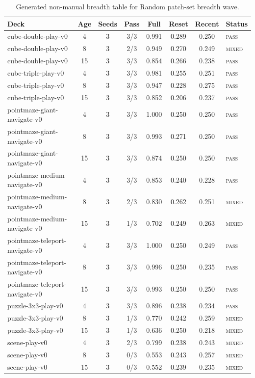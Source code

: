 \begin{table}[!tbp]
\centering
\scriptsize
\setlength{\tabcolsep}{3.5pt}
\renewcommand{\arraystretch}{1.05}
\caption{Generated non-manual breadth table for Random patch-set breadth wave.}
\begin{tabular}{lccccccl}
\toprule
Deck & Age & Seeds & Pass & Full & Reset & Recent & Status\\
\midrule
cube-double-play-v0 & 4 & 3 & 3/3 & 0.991 & 0.289 & 0.250 & \textsc{pass}\\
cube-double-play-v0 & 8 & 3 & 2/3 & 0.949 & 0.270 & 0.249 & \textsc{mixed}\\
cube-double-play-v0 & 15 & 3 & 3/3 & 0.854 & 0.266 & 0.238 & \textsc{pass}\\
cube-triple-play-v0 & 4 & 3 & 3/3 & 0.981 & 0.255 & 0.251 & \textsc{pass}\\
cube-triple-play-v0 & 8 & 3 & 3/3 & 0.947 & 0.228 & 0.275 & \textsc{pass}\\
cube-triple-play-v0 & 15 & 3 & 3/3 & 0.852 & 0.206 & 0.237 & \textsc{pass}\\
pointmaze-giant-navigate-v0 & 4 & 3 & 3/3 & 1.000 & 0.250 & 0.250 & \textsc{pass}\\
pointmaze-giant-navigate-v0 & 8 & 3 & 3/3 & 0.993 & 0.271 & 0.250 & \textsc{pass}\\
pointmaze-giant-navigate-v0 & 15 & 3 & 3/3 & 0.874 & 0.250 & 0.250 & \textsc{pass}\\
pointmaze-medium-navigate-v0 & 4 & 3 & 3/3 & 0.853 & 0.240 & 0.228 & \textsc{pass}\\
pointmaze-medium-navigate-v0 & 8 & 3 & 2/3 & 0.830 & 0.262 & 0.251 & \textsc{mixed}\\
pointmaze-medium-navigate-v0 & 15 & 3 & 1/3 & 0.702 & 0.249 & 0.263 & \textsc{mixed}\\
pointmaze-teleport-navigate-v0 & 4 & 3 & 3/3 & 1.000 & 0.250 & 0.249 & \textsc{pass}\\
pointmaze-teleport-navigate-v0 & 8 & 3 & 3/3 & 0.996 & 0.250 & 0.235 & \textsc{pass}\\
pointmaze-teleport-navigate-v0 & 15 & 3 & 3/3 & 0.993 & 0.250 & 0.250 & \textsc{pass}\\
puzzle-3x3-play-v0 & 4 & 3 & 3/3 & 0.896 & 0.238 & 0.234 & \textsc{pass}\\
puzzle-3x3-play-v0 & 8 & 3 & 1/3 & 0.770 & 0.242 & 0.259 & \textsc{mixed}\\
puzzle-3x3-play-v0 & 15 & 3 & 1/3 & 0.636 & 0.250 & 0.218 & \textsc{mixed}\\
scene-play-v0 & 4 & 3 & 2/3 & 0.799 & 0.238 & 0.243 & \textsc{mixed}\\
scene-play-v0 & 8 & 3 & 0/3 & 0.553 & 0.243 & 0.257 & \textsc{mixed}\\
scene-play-v0 & 15 & 3 & 0/3 & 0.552 & 0.239 & 0.235 & \textsc{mixed}\\
\bottomrule
\end{tabular}
\end{table}

